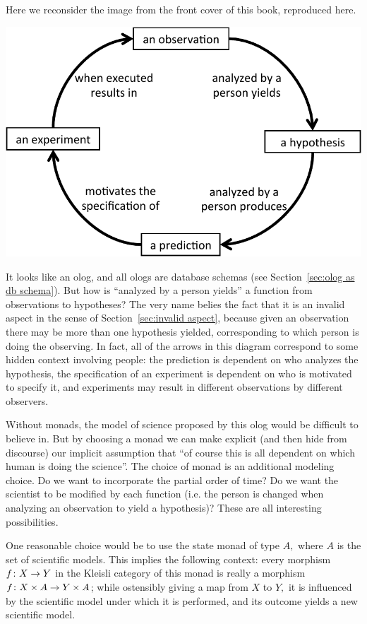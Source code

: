 \documentclass[CT4S-EN-RU]{subfiles}
\begin{document}
\begin{remarkRUS}\label{rem:state monad}
\end{remarkRUS}

\begin{exampleENG}\label{ex:scientific method}
Here we reconsider the image from the front cover of this book, reproduced here.
\begin{center}
\includegraphics[width=.8\textwidth]{ScientificMethod}
\end{center}

It looks like an olog, and all ologs are database schemas (see Section~\ref{sec:olog as db schema}). But how is “analyzed by a person yields” a function from observations to hypotheses? The very name belies the fact that it is an invalid aspect in the sense of Section~\ref{sec:invalid aspect}, because given an observation there may be more than one hypothesis yielded, corresponding to which person is doing the observing. In fact, all of the arrows in this diagram correspond to some hidden context involving people: the prediction is dependent on who analyzes the hypothesis, the specification of an experiment is dependent on who is motivated to specify it, and experiments may result in different observations by different observers. 

Without monads, the model of science proposed by this olog would be difficult to believe in. But by choosing a monad we can make explicit (and then hide from discourse) our implicit assumption that “of course this is all dependent on which human is doing the science”. The choice of monad is an additional modeling choice. Do we want to incorporate the partial order of time? Do we want the scientist to be modified by each function (i.e. the person is changed when analyzing an observation to yield a hypothesis)? These are all interesting possibilities. 

One reasonable choice would be to use the state monad of type $A,$ where $A$ is the set of scientific models. This implies the following context: every morphism $f\colon X\rightarrow Y$ in the Kleisli category of this monad is really a morphism $f\colon X\times A\rightarrow Y\times A$; while ostensibly giving a map from $X$ to $Y,$ it is influenced by the scientific model under which it is performed, and its outcome yields a new scientific model. 


\end{exampleENG}
\end{document}
